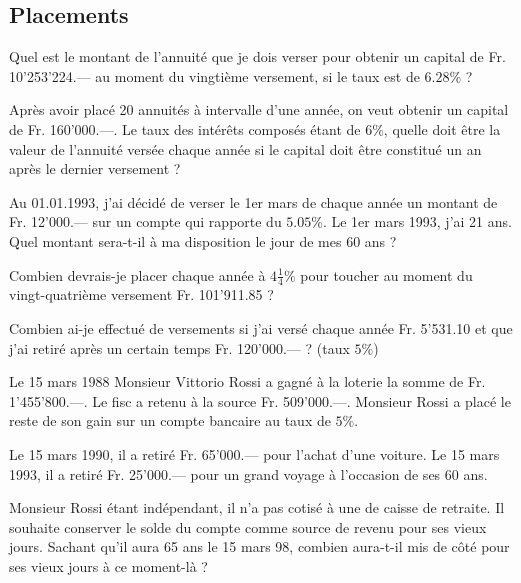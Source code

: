 \subsection{Placements}

\begin{exercice}
Quel est le montant de l’annuité que je dois verser pour obtenir un capital de Fr. 10'253'224.— au moment du vingtième versement, si le taux est de $6.28 \%$ ?
\end{exercice}

\begin{exercice}
Après avoir placé 20 annuités à intervalle d’une année, on veut obtenir un capital de Fr. 160'000.—. Le taux des intérêts composés étant de $6 \%$, quelle doit être la valeur de l’annuité versée chaque année si le capital doit être constitué un an après le dernier versement ?
\end{exercice}

\begin{exercice}
Au 01.01.1993, j’ai décidé de verser le 1er mars de chaque année un montant de Fr. 12'000.— sur un compte qui rapporte du $5.05 \%$.
	Le 1er mars 1993, j’ai 21 ans. Quel montant sera-t-il à ma disposition le jour de mes 60 ans ?


Combien devrais-je placer chaque année à $4\frac{1}{4} \%$ pour toucher au moment du vingt-quatrième versement Fr. 101'911.85  ?
\end{exercice}

\begin{exercice}
Combien ai-je effectué de versements si j’ai versé chaque année Fr. 5'531.10 et que j’ai retiré après un certain temps Fr. 120'000.— ? (taux $5 \%$)
\end{exercice}

\begin{exercice}
Le 15 mars 1988 Monsieur Vittorio Rossi  a gagné à la loterie la somme de Fr. 1'455'800.—. Le fisc a retenu à la source Fr. 509'000.—.
Monsieur Rossi a placé le reste de son gain sur un compte bancaire au taux de $5 \%$.

Le 15 mars 1990, il a retiré Fr. 65'000.— pour l’achat d’une voiture.
Le 15 mars 1993, il a retiré Fr. 25'000.— pour un grand voyage à l’occasion de ses 60 ans.

Monsieur Rossi étant indépendant, il n’a pas cotisé à une de caisse de retraite. Il souhaite conserver le solde du compte comme source de revenu pour ses vieux jours.
Sachant qu’il aura 65 ans le 15 mars 98, combien aura-t-il mis de côté pour ses vieux jours à ce moment-là ?
\end{exercice}

